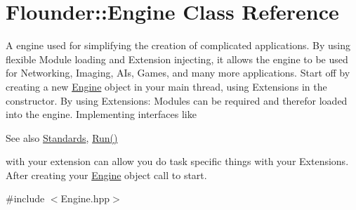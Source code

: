 \hypertarget{class_flounder_1_1_engine}{}\section{Flounder\+:\+:Engine Class Reference}
\label{class_flounder_1_1_engine}


A engine used for simplifying the creation of complicated applications. By using flexible Module loading and Extension injecting, it allows the engine to be used for Networking, Imaging, A\+Is, Games, and many more applications. Start off by creating a new \hyperlink{class_flounder_1_1_engine}{Engine} object in your main thread, using Extensions in the constructor. By using Extensions\+: Modules can be required and therefor loaded into the engine. Implementing interfaces like \begin{DoxySeeAlso}{See also}
\hyperlink{class_flounder_1_1_standards}{Standards}, \hyperlink{class_flounder_1_1_engine_afb64e3656bdacc87a776202545d5adbf}{Run()}


\end{DoxySeeAlso}
with your extension can allow you do task specific things with your Extensions. After creating your \hyperlink{class_flounder_1_1_engine}{Engine} object call  to start.  




{\ttfamily \#include $<$Engine.\+hpp$>$}


